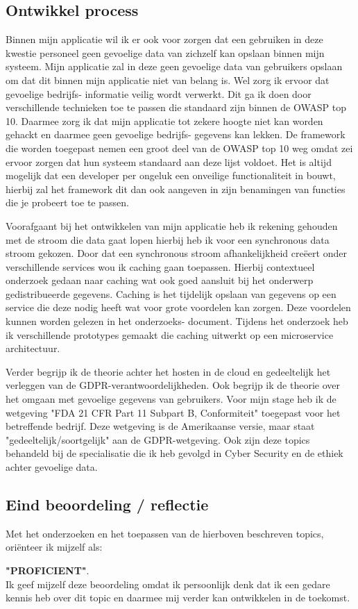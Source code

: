 \subsection{Ontwikkel process}
Binnen mijn applicatie wil ik er ook voor zorgen dat een gebruiken in deze kwestie personeel geen gevoelige data van zichzelf kan opslaan binnen mijn systeem.
Mijn applicatie zal in deze geen gevoelige data van gebruikers opslaan om dat dit binnen mijn applicatie niet van belang is.
Wel zorg ik ervoor dat gevoelige bedrijfs- informatie veilig wordt verwerkt.
Dit ga ik doen door verschillende technieken toe te passen die standaard zijn binnen de OWASP top 10.
Daarmee zorg ik dat mijn applicatie tot zekere hoogte niet kan worden gehackt en daarmee geen gevoelige bedrijfs- gegevens kan lekken.
De framework die worden toegepast nemen een groot deel van de OWASP top 10 weg omdat zei ervoor zorgen dat hun systeem standaard aan deze lijst voldoet.
Het is altijd mogelijk dat een developer per ongeluk een onveilige functionaliteit in bouwt,
hierbij zal het framework dit dan ook aangeven in zijn benamingen van functies die je probeert toe te passen.

Voorafgaant bij het ontwikkelen van mijn applicatie heb ik rekening gehouden met de stroom die data gaat lopen hierbij heb ik voor een synchronous data stroom gekozen.
Door dat een synchronous stroom afhankelijkheid creëert onder verschillende services wou ik caching gaan toepassen.
Hierbij contextueel onderzoek gedaan naar caching wat ook goed aansluit bij het onderwerp gedistribueerde gegevens.
Caching is het tijdelijk opslaan van gegevens op een service die deze nodig heeft wat voor grote voordelen kan zorgen.
Deze voordelen kunnen worden gelezen in het onderzoeks- document.
Tijdens het onderzoek heb ik verschillende prototypes gemaakt die caching uitwerkt op een microservice architectuur.

Verder begrijp ik de theorie achter het hosten in de cloud en gedeeltelijk het verleggen van de GDPR-verantwoordelijkheden.
Ook begrijp ik de theorie over het omgaan met gevoelige gegevens van gebruikers.
Voor mijn stage heb ik de wetgeving "FDA 21 CFR Part 11 Subpart B, Conformiteit" toegepast voor het betreffende bedrijf.
Deze wetgeving is de Amerikaanse versie, maar staat "gedeeltelijk/soortgelijk" aan de GDPR-wetgeving.
Ook zijn deze topics behandeld bij de specialisatie die ik heb gevolgd in Cyber Security en de ethiek achter gevoelige data.

\subsection{Eind beoordeling / reflectie}
Met het onderzoeken en het toepassen van de hierboven beschreven topics,
oriënteer ik mijzelf als:
\par\vspace{10pt}\textbf{\uppercase{"Proficient"}}.\\
Ik geef mijzelf deze beoordeling omdat ik persoonlijk denk dat ik een gedare kennis heb over dit topic en daarmee mij verder kan ontwikkelen in de toekomst.

